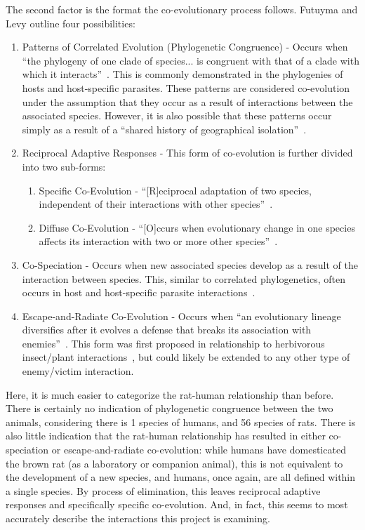 \documentclass[12pt]{article}
\begin{document}
The second factor is the format the co-evolutionary process follows. Futuyma and Levy outline four possibilities:
\begin{enumerate}
\item Patterns of Correlated Evolution (Phylogenetic Congruence) - Occurs when ``the phylogeny of one clade of species... is congruent with that of a clade with which it interacts''~\cite{FutuymaLevy2001}. This is commonly demonstrated in the phylogenies of hosts and host-specific parasites. These patterns are considered co-evolution under the assumption that they occur as a result of interactions between the associated species. However, it is also possible that these patterns occur simply as a result of a ``shared history of geographical isolation''~\cite{FutuymaLevy2001}.
\item Reciprocal Adaptive Responses - This form of co-evolution is further divided into two sub-forms:
\begin{enumerate}
\item Specific Co-Evolution - ``[R]eciprocal adaptation of two species, independent of their interactions with other species''~\cite{FutuymaLevy2001}.
\item Diffuse Co-Evolution - ``[O]ccurs when evolutionary change in one species affects its interaction with two or more other species''~\cite{FutuymaLevy2001}.
\end{enumerate}
\item Co-Speciation - Occurs when new associated species develop as a result of the interaction between species. This, similar to correlated phylogenetics, often occurs in host and host-specific parasite interactions~\cite{FutuymaLevy2001}.
\item Escape-and-Radiate Co-Evolution - Occurs when ``an evolutionary lineage diversifies after it evolves a defense that breaks its association with enemies''~\cite{FutuymaLevy2001}. This form was first proposed in relationship to herbivorous insect/plant interactions~\cite{FutuymaLevy2001}, but could likely be extended to any other type of enemy/victim interaction.
\end{enumerate}
Here, it is much easier to categorize the rat-human relationship than before. There is certainly no indication of phylogenetic congruence between the two animals, considering there is 1 species of humans, and 56 species of rats. There is also little indication that the rat-human relationship has resulted in either co-speciation or escape-and-radiate co-evolution: while humans have domesticated the brown rat (as a laboratory or companion animal), this is not equivalent to the development of a new species, and humans, once again, are all defined within a single species. By process of elimination, this leaves reciprocal adaptive responses and specifically specific co-evolution. And, in fact, this seems to most accurately describe the interactions this project is examining.
\end{document}
